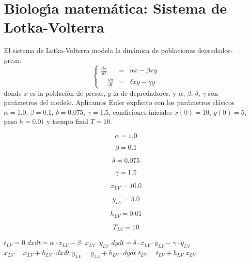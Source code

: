 \documentclass{article}
\begin{document}
\section{Biolog\'{\i}a matem\'atica: Sistema de Lotka-Volterra}

El sistema de Lotka-Volterra modela la din\'amica de poblaciones depredador-presa:
\[
\left \{
\begin{array}{rrrr}
    \frac{dx}{dt} & = &\alpha x - \beta x y \\
    \quad \frac{dy}{dt} & = &\delta x y - \gamma y
\end{array}
\right .
\]
donde $x$ es la poblaci\'on de presas, $y$ la de depredadores, y $\alpha$, $\beta$,
$\delta$, $\gamma$ son par\'ametros del modelo. Aplicamos Euler expl\'{\i}cito con los
par\'ametros cl\'asicos $\alpha = 1.0$, $\beta = 0.1$, $\delta = 0.075$, $\gamma = 1.5$,
condiciones iniciales $x(0) = 10$, $y(0) = 5$, paso $h = 0.01$ y tiempo final $T = 10$.

\begin{equation}
    \alpha = 1.0
    \label{eq:calc:alpha}
\end{equation}

\begin{equation}
    \beta = 0.1
    \label{eq:calc:beta}
\end{equation}

\begin{equation}
    \delta = 0.075
    \label{eq:calc:delta}
\end{equation}

\begin{equation}
    \gamma = 1.5
    \label{eq:calc:gamma}
\end{equation}

\begin{equation}
    x_{LV} = 10.0
    \label{eq:calc:xlv}
\end{equation}

\begin{equation}
    y_{LV} = 5.0
    \label{eq:calc:ylv}
\end{equation}

\begin{equation}
    h_{LV} = 0.01
    \label{eq:calc:hlv}
\end{equation}

\begin{equation}
    T_{LV} = 10
    \label{eq:calc:Tlv}
\end{equation}

\begin{algorithm}
\caption{Euler expl\'{\i}cito para el sistema de Lotka-Volterra}
\begin{algorithmic}
    \STATE $t_{LV} = 0$
        \STATE $dxdt = \alpha \cdot x_{LV} - \beta \cdot x_{LV} \cdot y_{LV}$
        \STATE $dydt = \delta \cdot x_{LV} \cdot y_{LV} - \gamma \cdot y_{LV}$
        \STATE $x_{LV} = x_{LV} + h_{LV} \cdot dxdt$
        \STATE $y_{LV} = y_{LV} + h_{LV} \cdot dydt$
        \STATE $t_{LV} = t_{LV} + h_{LV}$
    \ENDWHILE
    \RETURN $x_{LV}$
\end{algorithmic}
\end{algorithm}
\end{document}
